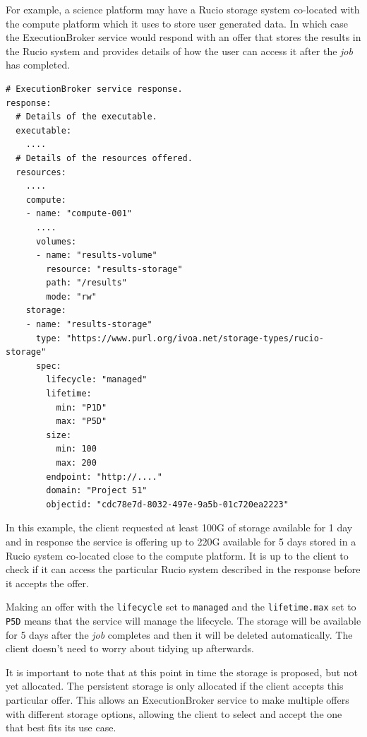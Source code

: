 \documentclass[11pt,a4paper]{ivoa}
\newcommand{\execbrokerclass} {ExecutionBroker}
\newcommand{\rucio} {Rucio}
\newcommand{\codeword}[1] {\texttt{#1}}
\newcommand{\job} {\textit{job}}
\begin{document}
For example, a science platform may have a \rucio{} storage system co-located
with the compute platform which it uses to store user generated data.
In which case the \execbrokerclass{} service would respond with an offer that
stores the results in the \rucio{} system and provides details of how the user
can access it after the \job{} has completed.

\begin{lstlisting}[]
# ExecutionBroker service response.
response:
  # Details of the executable.
  executable:
    ....
  # Details of the resources offered.
  resources:
    ....
    compute:
    - name: "compute-001"
      ....
      volumes:
      - name: "results-volume"
        resource: "results-storage"
        path: "/results"
        mode: "rw"
    storage:
    - name: "results-storage"
      type: "https://www.purl.org/ivoa.net/storage-types/rucio-storage"
      spec:
        lifecycle: "managed"
        lifetime:
          min: "P1D"
          max: "P5D"
        size:
          min: 100
          max: 200
        endpoint: "http://...."
        domain: "Project 51"
        objectid: "cdc78e7d-8032-497e-9a5b-01c720ea2223"
\end{lstlisting}

In this example, the client requested at least 100G of storage available for 1 day
and in response the service is offering up to 220G available for 5 days stored in a
\rucio{} system co-located close to the compute platform.
It is up to the client to check if it can access the particular \rucio{} system
described in the response before it accepts the offer.

Making an offer with the \codeword{lifecycle} set to \codeword{managed} and the
\codeword{lifetime.max} set to \codeword{P5D}
means that the service will manage the lifecycle.
The storage will be available for 5 days after the \job{} completes and then it
will be deleted automatically.
The client doesn't need to worry about tidying up afterwards.

It is important to note that at this point in time the storage is proposed, but not yet allocated.
The persistent storage is only allocated if the client accepts this particular offer.
This allows an \execbrokerclass{} service to make multiple offers with different storage options,
allowing the client to select and accept the one that best fits its use case.
\end{document}
